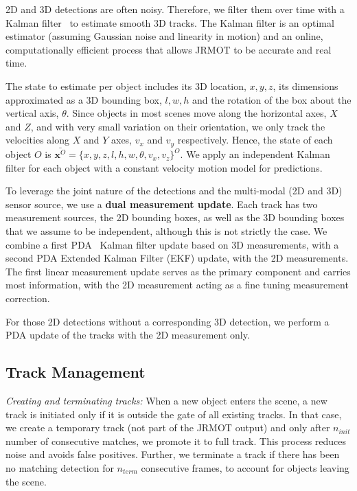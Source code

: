 \documentclass[letterpaper, 10 pt, conference]{ieeeconf}
\newcommand{\methodname}{{JRMOT}\xspace}
\begin{document}
2D and 3D detections are often noisy. Therefore, we filter them over time with a Kalman filter~\cite{kalman1960new} to estimate smooth 3D tracks. The Kalman filter is an optimal estimator (assuming Gaussian noise and linearity in motion) and an online, computationally efficient process that allows \methodname to be accurate and real time.

The state to estimate per object includes its 3D location, $x, y, z$, its dimensions approximated as a 3D bounding box, $l, w, h$ and the rotation of the box about the vertical axis, $\theta$. Since objects in most scenes move along the horizontal axes, $X$ and $Z$, and with very small variation on their orientation, we only track the velocities along $X$ and $Y$ axes, $v_x$ and $v_y$ respectively. Hence, the state of each object $O$ is $\bar{\mathbf{x}^{O}} = \{x, y, z, l, h, w, \theta, v_x, v_z\}^{O}$. We apply an independent Kalman filter for each object with a constant velocity motion model for predictions.

To leverage the joint nature of the detections and the multi-modal (2D and 3D) sensor source, we use a \textbf{dual measurement update}. Each track has two measurement sources, the 2D bounding boxes, as well as the 3D bounding boxes that we assume to be independent, although this is not strictly the case. We combine a first PDA~\cite{bar2009probabilistic} Kalman filter update based on 3D measurements, with a second PDA Extended Kalman Filter (EKF) update, with the 2D measurements. The first linear measurement update serves as the primary component and carries most information, with the 2D measurement acting as a fine tuning measurement correction.

For those 2D detections without a corresponding 3D detection, we perform a PDA update of the tracks with the 2D measurement only.










\subsection{Track Management}
\label{ss:track_manage}

\textit{Creating and terminating tracks:} When a new object enters the scene, a new track is initiated only if it is outside the gate of all existing tracks. In that case, we create a temporary track (not part of the \methodname output) and only after $n_{init}$ number of consecutive matches, we promote it to full track. This process reduces noise and avoids false positives. Further, we terminate a track if there has been no matching detection for $n_{term}$ consecutive frames, to account for objects leaving the scene. 
\end{document}
